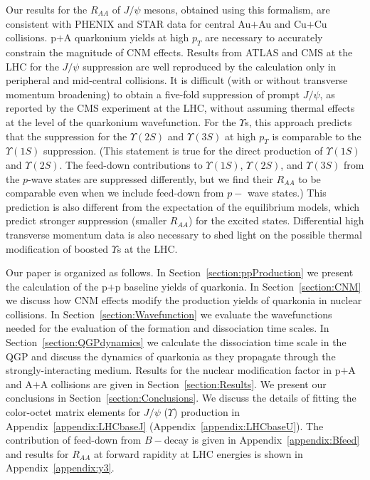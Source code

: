 \documentclass[article,showpacs,preprintnumbers,amsmath,amssymb]{revtex4}
\begin{document}
Our results for the $R_{AA}$ of $J/\psi$ mesons, obtained using this formalism,
are consistent with PHENIX and STAR data for central Au$+$Au and Cu$+$Cu
collisions.  p$+$A quarkonium yields at high $p_T$ are necessary to
accurately constrain the magnitude of CNM effects. Results from ATLAS and CMS
at the LHC for the $J/\psi$ suppression are well reproduced by the calculation
only in peripheral and mid-central collisions.  It is difficult (with or
without transverse momentum broadening) to obtain a five-fold suppression  of
prompt $J/\psi$, as reported by the CMS experiment at the LHC, without assuming
thermal effects at the level of the quarkonium wavefunction. For the
$\Upsilon$s, this approach predicts that the suppression for the $\Upsilon(2S)$
and $\Upsilon(3S)$ at high $p_T$ is comparable to the $\Upsilon(1S)$
suppression. (This statement is true for the direct production of $\Upsilon(1S)$
and $\Upsilon(2S)$. The feed-down contributions to $\Upsilon(1S)$, $\Upsilon(2S)$,
and $\Upsilon(3S)$ from the $p$-wave states are suppressed differently, but we
find their $R_{AA}$ to be comparable even when we include feed-down from $p-$
wave states.) This prediction is also different from the expectation of the
equilibrium models, which predict stronger suppression (smaller $R_{AA}$) for
the excited states.  Differential high transverse momentum data is also
necessary to shed light on the possible thermal modification of boosted
$\Upsilon$s at the LHC.

 
Our paper is organized as follows. In Section~\ref{section:ppProduction} we
present  the calculation of the p$+$p baseline yields of quarkonia. 
In Section~\ref{section:CNM} we
discuss how CNM effects modify the production yields of quarkonia in nuclear
collisions.  In Section~\ref{section:Wavefunction} we evaluate the
wavefunctions needed for the evaluation of the formation and dissociation
time scales.  In Section~\ref{section:QGPdynamics} we calculate the dissociation
time scale in the QGP and discuss the dynamics of quarkonia as they propagate
through the strongly-interacting medium. Results for the nuclear modification
factor  in p$+$A and A$+$A collisions  are given in
Section~\ref{section:Results}. We present our conclusions in
Section~\ref{section:Conclusions}. We discuss the details of fitting the
color-octet matrix elements for $J/\psi$ ($\Upsilon$) production in
Appendix~\ref{appendix:LHCbaseJ} (Appendix~\ref{appendix:LHCbaseU}). The
contribution of feed-down from $B-$decay is given in
Appendix~\ref{appendix:Bfeed} and results for $R_{AA}$ at forward rapidity at LHC
energies is shown in Appendix~\ref{appendix:y3}.
\end{document}
